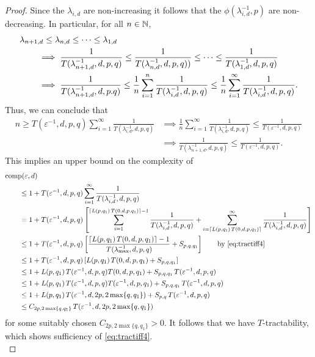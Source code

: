 \documentclass[11pt,a4paper]{article}
\begin{document}
{\begin{proof}
Since the $\lambda_{i,d}$ are non-increasing it follows that the $\phi(\lambda_{i, d}^{-1},p)$ are non-decreasing.  
In particular, for all $n \in \mathbb{N}$,
\begin{align*}
    \MoveEqLeft{\lambda_{n+1,d} \le \lambda_{n,d} \le \cdots \le \lambda_{1,d}} \\
    & \implies \frac{1}{T(\lambda_{n+1, d}^{-1},d,p,q)} \le \frac{1}{T(\lambda_{n, d}^{-1},d,p,q))} \le \cdots \le \frac{1}{T(\lambda_{1, d}^{-1},d,p,q)} \\
    & \implies \frac{1}{T(\lambda_{n+1, d}^{-1},d,p.q)} 
    \le \frac 1n \sum_{i=1}^n  \frac{1}{T(\lambda_{i, d}^{-1},d,p,q)} 
    \le \frac 1n \sum_{i=1}^\infty  \frac{1}{T(\lambda_{i, d}^{-1},d,p,q)}.
\end{align*}
Thus, we can conclude that 
\begin{align*}
    n \ge T(\varepsilon^{-1},d,p,q) \sum_{i=1}^\infty \frac{1}{T(\lambda_{i, d}^{-1},d,p,q)}
    & \implies 
  \frac 1n \sum_{i=1}^\infty \frac{1}{T(\lambda_{i, d}^{-1},d,p,q)} \le  \frac{1}{T(\varepsilon^{-1},d,p,q)} \\
   & \implies   \frac{1}{T(\lambda_{n+1, d}^{-1},d,p,q)} \le \frac{1}{T(\varepsilon^{-1},d,p,q)}.
\end{align*}
This implies an upper bound on the complexity of
\begin{align*}
       \MoveEqLeft{\comp(\varepsilon,d)} \\
       &\le 1 + T(\varepsilon^{-1},d,p,q) \sum_{i=1}^\infty \frac{1}{T(\lambda_{i, d}^{-1},d,p,q)} \\       
       & = 1 + T(\varepsilon^{-1},d,p,q) \left [ \sum_{i=1}^{\lceil L(p,q_1)\, T(0,d,p,q_1)\rceil -1} \frac{1}{T(\lambda_{i, d}^{-1},d,p,q)}  
       + \sum_{i=\lceil L(p,q_1)\, T(0,d,p,q_1) \rceil}^\infty \frac{1}{T(\lambda_{i, d}^{-1},d,p,q)} \right ] \\
       & \le 1+ T(\varepsilon^{-1},d,p,q)\left[ \frac{\lceil L(p,q_1)\, T(0,d,p,q_1)\rceil-1}{T(\lambda_{\max}^{-1},d,p,q)} + S_{p,q,q_1}\right]
        \qquad \text{by \eqref{eq:tractiff4}} \\
       & \le 1+ T(\varepsilon^{-1},d,p,q)\left[L(p,q_1)\, T(0,d,p,q_1) + S_{p,q,q_1}\right]\\ 
       & \le 1+L(p,q_1)\,T(\varepsilon^{-1},d,p,q) T(0,d,p,q_1) + S_{p,q,q_1}\, T(\varepsilon^{-1},d,p,q)\\
       & \le 1+L(p,q_1)\,T(\varepsilon^{-1},d,p,q) T(\varepsilon^{-1},d,p,q_1) + S_{p,q,q_1}\, T(\varepsilon^{-1},d,p,q)\\
       & \le 1+L(p,q_1)\,T(\varepsilon^{-1},d,2p,2\max\{q,q_1\})  + S_{p,q}\, T(\varepsilon^{-1},d,p,q)  \\
       & \le C_{2p,2\max\{q,q_1\}} \,T(\varepsilon^{-1},d,2p,2\max\{q,q_1\})
\end{align*}
for some suitably chosen $C_{2p,2\max\{q,q_1\}}>0$. It follows that we have $T$-tractability, which shows sufficiency of \eqref{eq:tractiff4}. \\




\end{proof}}
\end{document}
